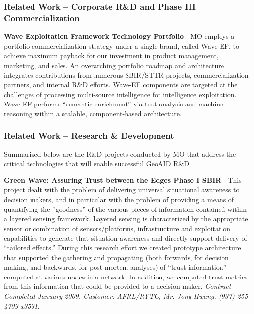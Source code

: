 \documentclass{sbir}
\begin{document}
\subsubsection{Related Work -- Corporate R\&D and Phase III Commercialization}
{\bfseries Wave Exploitation Framework Technology Portfolio}---MO employs a portfolio commercialization strategy under a single brand, called Wave-EF, to achieve maximum payback for our investment in product management, marketing, and sales. An overarching portfolio roadmap and architecture integrates contributions from numerous SBIR/STTR projects, commercialization partners, and internal R\&D efforts. Wave-EF components are targeted at the challenges of processing multi-source intelligence for intelligence exploitation. Wave-EF performs ``semantic enrichment'' via text analysis and machine reasoning within a scalable, component-based architecture.

\subsubsection{Related Work -- Research \& Development}\label{MO-related}
Summarized below are the R\&D projects conducted by MO that address the critical technologies that will enable successful GeoAID R\&D.

{\bf Green Wave: Assuring Trust between the Edges Phase I SBIR}---This project dealt with the problem of delivering universal situational awareness to decision makers, and in particular with the problem of providing a means of quantifying the ``goodness'' of the various pieces of information contained within a layered sensing framework. Layered sensing is characterized by the appropriate sensor or combination of sensors/platforms, infrastructure and exploitation capabilities to generate that situation awareness and directly support delivery of ``tailored effects.'' During this research effort we created prototype architecture that supported the gathering and propagating (both forwards, for decision making, and backwards, for post mortem analyses) of ``trust information'' computed at various nodes in a network. In addition, we computed trust metrics from this information that could be provided to a decision maker. \emph{Contract Completed January 2009. Customer: AFRL/RYTC, Mr. Jong Hwang. (937) 255-4709 x3591}.
\end{document}
